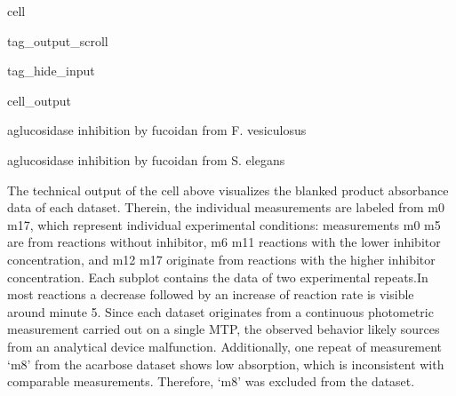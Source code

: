 \documentclass[letterpaper,12pt,english]{jupyterBook}
\begin{document}
\begin{sphinxuseclass}{cell}
\begin{sphinxuseclass}{tag_output_scroll}
\begin{sphinxuseclass}{tag_hide_input}
\begin{sphinxVerbatimOutput}
\begin{sphinxuseclass}{cell_output}
\noindent{}

\begin{sphinxVerbatim}[commandchars=\\\{\}]
a\PYGZhy{}glucosidase inhibition by fucoidan from F. vesiculosus
\end{sphinxVerbatim}

\noindent{}

\begin{sphinxVerbatim}[commandchars=\\\{\}]
a\PYGZhy{}glucosidase inhibition by fucoidan from S. elegans
\end{sphinxVerbatim}

\noindent{}

\end{sphinxuseclass}\end{sphinxVerbatimOutput}

\end{sphinxuseclass}
\end{sphinxuseclass}
\end{sphinxuseclass}
\sphinxAtStartPar
The technical output of the cell above visualizes the blanked product absorbance data of each dataset. Therein, the individual measurements are labeled from m0 \sphinxhyphen{} m17, which represent individual experimental conditions: measurements m0 \sphinxhyphen{} m5 are from reactions without inhibitor, m6 \sphinxhyphen{} m11 reactions with the lower inhibitor concentration, and m12 \sphinxhyphen{} m17 originate from reactions with the higher inhibitor concentration. Each subplot contains the data of two experimental repeats.In most reactions a decrease followed by an increase of reaction rate is visible around minute 5. Since each dataset originates from a continuous photometric measurement carried out on a single MTP, the observed behavior likely sources from an analytical device malfunction. Additionally, one repeat of measurement ‘m8’ from the acarbose dataset shows low absorption, which is inconsistent with comparable measurements. Therefore, ‘m8’ was excluded from the dataset.
\end{document}
